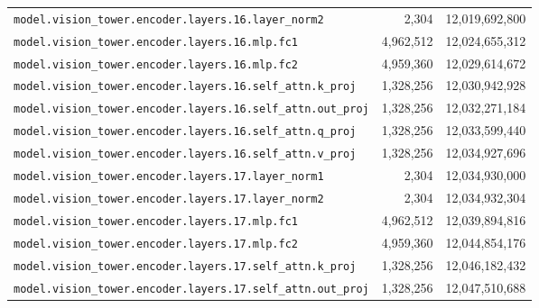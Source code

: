 \documentclass[10pt,a4paper]{article}
\theoremstyle{definition}
\begin{document}
\begin{appendices}
\begin{longtable}{p{9.5cm}rr}
\texttt{model.\allowbreak{}vision\_tower.\allowbreak{}encoder.\allowbreak{}layers.\allowbreak{}16.\allowbreak{}layer\_norm2} & 2,304 & 12,019,692,800 \\
\texttt{model.\allowbreak{}vision\_tower.\allowbreak{}encoder.\allowbreak{}layers.\allowbreak{}16.\allowbreak{}mlp.\allowbreak{}fc1} & 4,962,512 & 12,024,655,312 \\
\texttt{model.\allowbreak{}vision\_tower.\allowbreak{}encoder.\allowbreak{}layers.\allowbreak{}16.\allowbreak{}mlp.\allowbreak{}fc2} & 4,959,360 & 12,029,614,672 \\
\texttt{model.\allowbreak{}vision\_tower.\allowbreak{}encoder.\allowbreak{}layers.\allowbreak{}16.\allowbreak{}self\_attn.\allowbreak{}k\_proj} & 1,328,256 & 12,030,942,928 \\
\texttt{model.\allowbreak{}vision\_tower.\allowbreak{}encoder.\allowbreak{}layers.\allowbreak{}16.\allowbreak{}self\_attn.\allowbreak{}out\_proj} & 1,328,256 & 12,032,271,184 \\
\texttt{model.\allowbreak{}vision\_tower.\allowbreak{}encoder.\allowbreak{}layers.\allowbreak{}16.\allowbreak{}self\_attn.\allowbreak{}q\_proj} & 1,328,256 & 12,033,599,440 \\
\texttt{model.\allowbreak{}vision\_tower.\allowbreak{}encoder.\allowbreak{}layers.\allowbreak{}16.\allowbreak{}self\_attn.\allowbreak{}v\_proj} & 1,328,256 & 12,034,927,696 \\
\texttt{model.\allowbreak{}vision\_tower.\allowbreak{}encoder.\allowbreak{}layers.\allowbreak{}17.\allowbreak{}layer\_norm1} & 2,304 & 12,034,930,000 \\
\texttt{model.\allowbreak{}vision\_tower.\allowbreak{}encoder.\allowbreak{}layers.\allowbreak{}17.\allowbreak{}layer\_norm2} & 2,304 & 12,034,932,304 \\
\texttt{model.\allowbreak{}vision\_tower.\allowbreak{}encoder.\allowbreak{}layers.\allowbreak{}17.\allowbreak{}mlp.\allowbreak{}fc1} & 4,962,512 & 12,039,894,816 \\
\texttt{model.\allowbreak{}vision\_tower.\allowbreak{}encoder.\allowbreak{}layers.\allowbreak{}17.\allowbreak{}mlp.\allowbreak{}fc2} & 4,959,360 & 12,044,854,176 \\
\texttt{model.\allowbreak{}vision\_tower.\allowbreak{}encoder.\allowbreak{}layers.\allowbreak{}17.\allowbreak{}self\_attn.\allowbreak{}k\_proj} & 1,328,256 & 12,046,182,432 \\
\texttt{model.\allowbreak{}vision\_tower.\allowbreak{}encoder.\allowbreak{}layers.\allowbreak{}17.\allowbreak{}self\_attn.\allowbreak{}out\_proj} & 1,328,256 & 12,047,510,688 \\

\end{longtable}
\end{appendices}
\end{document}
